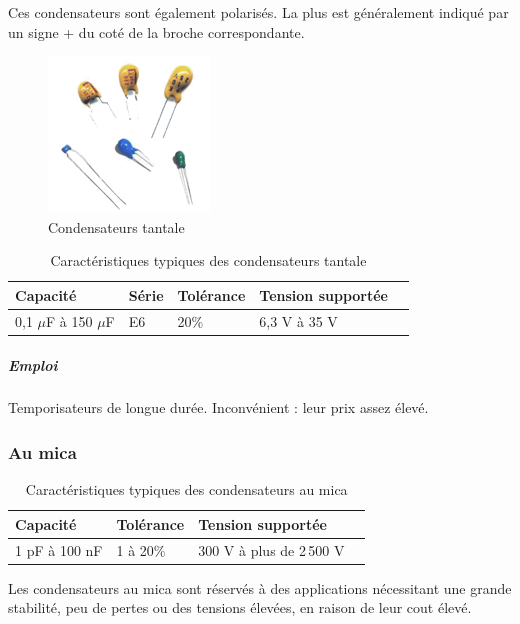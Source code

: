 \documentclass[a4paper]{article}
\begin{document}
Ces condensateurs sont également polarisés. La plus est généralement indiqué par un signe \og{}+\fg{} du coté de la broche correspondante.

\begin{figure}[H]
	\centering
	\includegraphics[scale=0.75]{Images/Condensateurs_tantale.png}
	\caption{Condensateurs tantale
		\label{Condensateurs_tantale}}
\end{figure}

\begin{table}[H]
	\centering
		\begin{tabular}{|l|l|l|l|l|}\hline
				Capacité & Série & Tolérance & Tension supportée\\\hline
				0,1 $\mu$F à 150 $\mu$F & E6 & 20\% & 6,3 V à 35 V\\\hline
		\end{tabular}
		\caption{Caractéristiques typiques des condensateurs tantale
			\label{Caracteristiques_des_condensateurs_tantale}}
\end{table}

\subparagraph{Emploi}

Temporisateurs de longue durée. Inconvénient : leur prix assez élevé.

\subsubsection{Au mica}

\begin{table}[H]
	\centering
		\begin{tabular}{|l|l|l|l|}\hline
				Capacité & Tolérance & Tension supportée\\\hline
				1 pF à 100 nF & 1 à 20\% & 300 V à plus de 2\,500 V\\\hline
		\end{tabular}
		\caption{Caractéristiques typiques des condensateurs au mica
			\label{Caracteristiques_des_condensateurs_au_mica}}
\end{table}

Les condensateurs au mica sont réservés à des applications nécessitant une grande stabilité, peu de pertes ou des tensions élevées, en raison de leur cout élevé.
\end{document}
